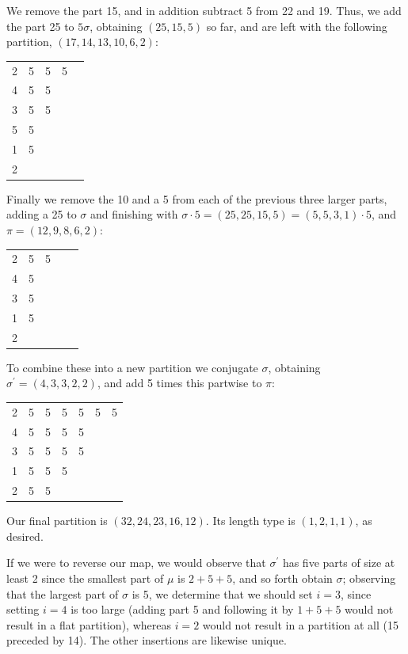\documentclass[11pt]{article}
\begin{document}
We remove the part 15, and in addition subtract 5 from 22 and 19.  Thus, we add the part 25 to $5\sigma$, obtaining $(25,15,5)$ so far, and are left with the following partition, $(17, 14, 13, 10, 6, 2)$:

\begin{center}
\begin{tabular}{ccccc}
2 & 5 & 5 & 5 & \\
4 & 5 & 5 & & \\
3 & 5 & 5 & & \\
5 & 5 & & & \\
1 & 5 & & & \\
2 & & & & 
\end{tabular}
\end{center}

Finally we remove the 10 and a 5 from each of the previous three larger parts, adding a 25 to $\sigma$ and finishing with $\sigma \cdot 5 = (25,25,15,5) = (5,5,3,1)\cdot 5$, and $\pi = (12,9,8,6,2)$:

\begin{center}
\begin{tabular}{ccccc}
2 & 5 & 5 & & \\
4 & 5 & & & \\
3 & 5 & & & \\
1 & 5 & & & \\
2 & & & & 
\end{tabular}
\end{center}

To combine these into a new partition we conjugate $\sigma$, obtaining $\sigma^{\prime} = (4,3,3,2,2)$, and add 5 times this partwise to $\pi$:

\begin{center}
\begin{tabular}{ccccccc}
2 & 5 & 5 & 5 & 5 & 5 & 5 \\
4 & 5 & 5 & 5 & 5 & & \\
3 & 5 & 5 & 5 & 5 & & \\
1 & 5 & 5 & 5 & & & \\
2 & 5 & 5 & & & & 
\end{tabular}
\end{center}

Our final partition is $(32, 24, 23, 16, 12)$.  Its length type is $(1,2,1,1)$, as desired.

If we were to reverse our map, we would observe that $\sigma^{\prime}$ has five parts of size at least 2 since the smallest part of $\mu$ is $2+5+5$, and so forth obtain $\sigma$; observing that the largest part of $\sigma$ is 5, we determine that we should set $i=3$, since setting $i=4$ is too large (adding part 5 and following it by $1+5+5$ would not result in a flat partition), whereas $i=2$ would not result in a partition at all (15 preceded by 14).  The other insertions are likewise unique.
\end{document}
